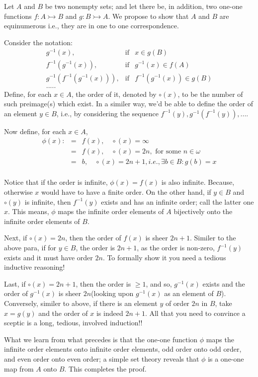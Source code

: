 \documentclass[12pt]{article}
\begin{document}
Let $A$ and $B$ be two nonempty sets; and let there be, in addition, two one-one functions $f:A\rightarrowtail B$ and $g:B\rightarrowtail A$. We propose to show that $A$ and $B$ are equinumerous i.e., they are in one to one correspondence.

Consider the notation:
\begin{eqnarray*}
 g^{-1}(x),&\mbox{if}& x\in g(B)\\
 f^{-1}(g^{-1}(x)),&\mbox{if}& g^{-1}(x)\in f(A)\\
 g^{-1}(f^{-1}(g^{-1}(x))),&\mbox{if}& f^{-1}(g^{-1}(x))\in g(B)\\
 .....
\end{eqnarray*}
Define, for each $x\in A$, the order of it, denoted by $\circ(x)$, to be the number of such preimage(s) which exist. In a similer way, we'd be able to define the order of an element $y\in B$, i.e., by considering the sequence $f^{-1}(y),g^{-1}(f^{-1}(y)),...$. 

Now define, for each $x\in A$,
\begin{eqnarray*}
\phi(x):&=& f(x),\quad  \circ(x)=\infty \\
&=&f(x),\quad  \circ(x)=2n,\mbox{ for some } n\in\omega\\
&=&b,\quad \circ(x)=2n+1,i.e.,\exists b\in B : g(b)=x\\
\end{eqnarray*}

Notice that if the order is infinite, $\phi(x)=f(x)$ is also infinite. Because, otherwise $x$ would have to have a finite order. On the other hand, if $y\in B$ and $\circ(y)$ is infinite, then $f^{-1}(y)$ exists and has an infinite order; call the latter one $x$. This means, $\phi$ maps the infinite order elements of $A$ bijectively onto the infinite order elements of $B$.

Next, if $\circ(x)=2n$, then the order of $f(x)$ is sheer $2n+1$. Similer to the above para, if for $y\in B$, the order is $2n+1$, as the order is non-zero, $f^{-1}(y)$ exists and it must have order $2n$. To formally show it you need a tedious inductive reasoning!

Last, if $\circ(x)=2n+1$, then the order is $\ge 1$, and so, $g^{-1}(x)$ exists and the order of $g^{-1}(x)$ is sheer $2n$(looking upon $g^{-1}(x)$ as an element of $B$). Conversely, similer to above, if there is an element $y$ of order $2n$ in $B$, take $x=g(y)$ and the order of $x$ is indeed $2n+1$. All that you need to convince a sceptic is a long, tedious, involved induction!!

What we learn from what precedes is that the one-one function $\phi$ maps the infinite order elements onto infinite order elements, odd order onto odd order, and even order onto even order; a simple set theory reveals that $\phi$ is a one-one map from $A$ onto $B$. This completes the proof. 

\end{document}

